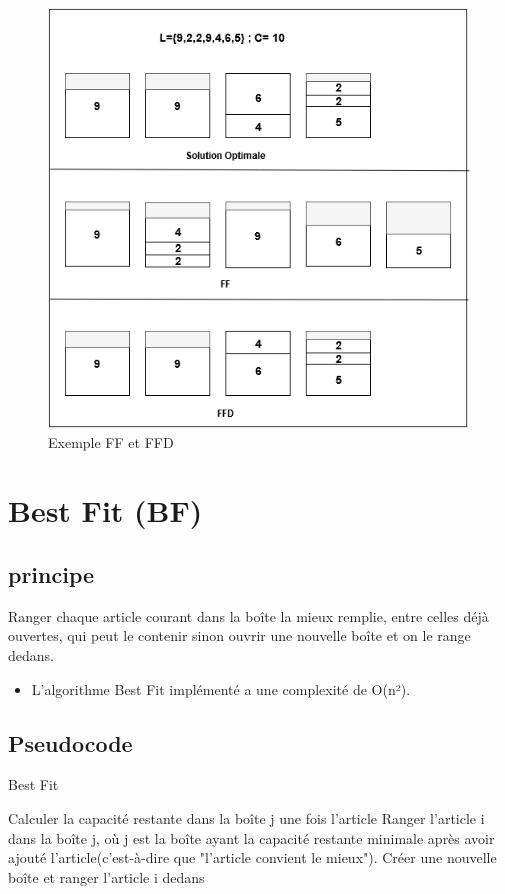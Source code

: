 \documentclass[12pt]{article}
\begin{document}
\begin{figure}[H]
    \includegraphics[width=\linewidth]{../figures/FF FFD.png}
    \caption{Exemple FF et FFD}
\end{figure}

\section{Best Fit (BF)}
\subsection{principe}
Ranger chaque article courant dans la boîte la mieux remplie, entre celles déjà ouvertes, qui peut le contenir sinon ouvrir une nouvelle boîte et on le range dedans.
\begin{itemize}
    \item L’algorithme Best Fit implémenté a une complexité de O(n²).
\end{itemize}

\subsection{Pseudocode}
\begin{algorithm}[!h]
    \caption{Best Fit}
    \begin{algorithmic}
              \STATE Calculer la capacité restante dans la boîte j une fois l'article
             \ENDIF 
        \ENDFOR
        \STATE Ranger l’article i dans la boîte j, où j est la boîte ayant la capacité restante minimale après avoir ajouté l’article(c'est-à-dire que "l’article convient le mieux").
            \STATE Créer une nouvelle boîte et ranger l’article i dedans
        \ENDIF
    \ENDFOR
    \end{algorithmic}
\end{algorithm}
\end{document}
